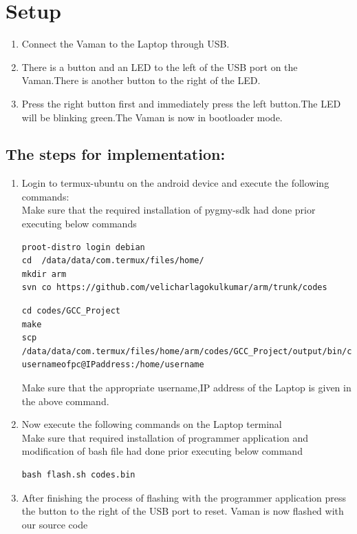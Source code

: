 \documentclass[10pt, a4paper]{article}
\begin{document}
\section{Setup}
\begin{enumerate}
\item Connect the Vaman to the Laptop through USB.
\item There is a button and an LED to the left of the USB port on the Vaman.There is another button to the right of the LED.
\item Press the right button first and immediately press the left button.The LED will be blinking green.The Vaman is now in bootloader mode.
\end{enumerate}
\subsection{The steps for implementation:}
\begin{enumerate}
\item Login to termux-ubuntu on the android device and execute the following commands:\\
Make sure that the required installation of pygmy-sdk had done prior executing below commands
\begin{lstlisting}
proot-distro login debian
cd  /data/data/com.termux/files/home/
mkdir arm
svn co https://github.com/velicharlagokulkumar/arm/trunk/codes
\end{lstlisting}
\begin{lstlisting}
cd codes/GCC_Project
make
scp /data/data/com.termux/files/home/arm/codes/GCC_Project/output/bin/codes.bin usernameofpc@IPaddress:/home/username
\end{lstlisting}
Make sure that the appropriate username,IP address of the Laptop is given in the above command.
\item Now execute the following commands on the Laptop terminal\\
Make sure that required installation of programmer application and modification of bash file had done prior executing below command
\begin{lstlisting}
bash flash.sh codes.bin
\end{lstlisting}
\item After finishing the process of flashing with the programmer application press the button to the right of the USB port to reset. Vaman is now flashed with our source code
\end{enumerate}
\end{document}
